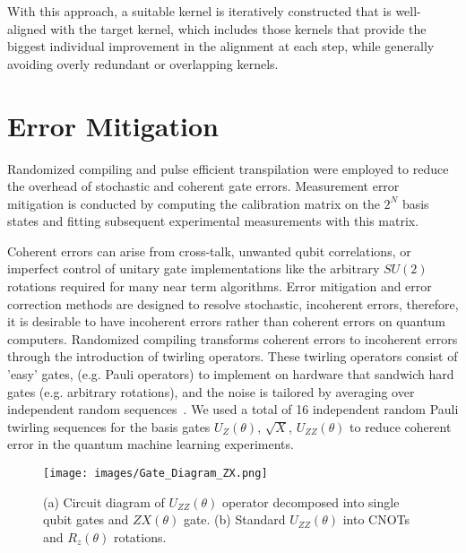 \documentclass[reprint,amsfonts, amssymb, amsmath,  showkeys, nofootinbib,pra, superscriptaddress, twocolumn,longbibliography]{revtex4-2}
\begin{document}
With this approach, a suitable kernel is iteratively constructed that is well-aligned with the target kernel, which includes those kernels that provide the biggest individual improvement in the alignment at each step, while generally avoiding overly redundant or overlapping kernels. 


\section{Error Mitigation}

Randomized compiling and pulse efficient transpilation were employed to reduce the overhead of stochastic and coherent gate errors. Measurement error mitigation is conducted by computing the calibration matrix on the $2^N$ basis states and fitting subsequent experimental measurements with this matrix.

Coherent errors can arise from cross-talk, unwanted qubit correlations, or imperfect control of unitary gate implementations like the arbitrary $SU(2)$ rotations required for many near term algorithms. Error mitigation and  error correction methods are designed to resolve stochastic, incoherent errors, therefore, it is desirable to have incoherent errors rather than coherent errors on quantum computers. Randomized compiling transforms coherent errors to incoherent errors through the introduction of twirling operators. These twirling operators consist of 'easy' gates, (e.g. Pauli operators) to implement on hardware that sandwich hard gates (e.g. arbitrary rotations), and the noise is tailored by averaging over independent random sequences~\cite{wallman2016twirl}. We used a total of 16 independent random Pauli twirling sequences for the basis gates $U_Z(\theta)$, $\sqrt{X}$, $U_{ZZ}(\theta)$ to reduce coherent error in the quantum machine learning experiments. 

\begin{figure}
\centering
    \texttt{[image: images/Gate\_Diagram\_ZX.png]}
    \caption{\label{Fig:zx_gate} (a) Circuit diagram of $U_{ZZ}(\theta)$ operator decomposed into single qubit gates and $ZX(\theta)$ gate. (b) Standard $U_{ZZ}(\theta)$ into CNOTs and $R_z(\theta)$ rotations.
    }
\end{figure}
\end{document}
